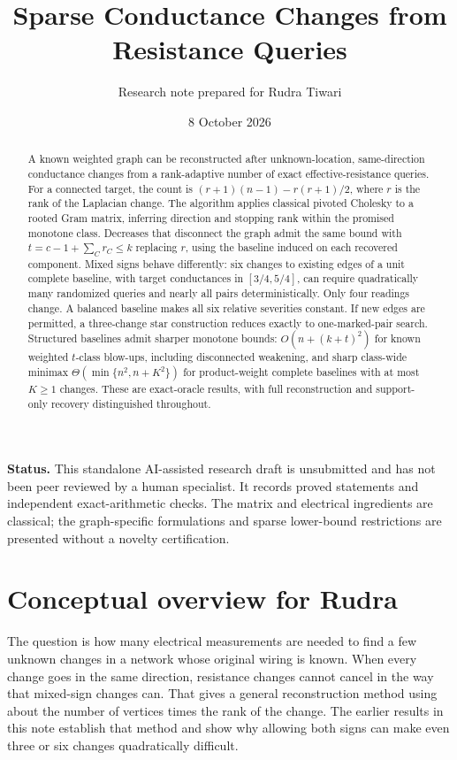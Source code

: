 \documentclass[11pt,letterpaper]{article}
\title{Sparse Conductance Changes from Resistance Queries}
\author{Research note prepared for Rudra Tiwari}
\date{8 October 2026}
\begin{document}
\maketitle
\begin{abstract}
A known weighted graph can be reconstructed after unknown-location, same-direction conductance changes from a rank-adaptive number of exact effective-resistance queries. For a connected target, the count is $(r+1)(n-1)-r(r+1)/2$, where $r$ is the rank of the Laplacian change. The algorithm applies classical pivoted Cholesky to a rooted Gram matrix, inferring direction and stopping rank within the promised monotone class. Decreases that disconnect the graph admit the same bound with $t=c-1+\sum_C r_C\le k$ replacing $r$, using the baseline induced on each recovered component. Mixed signs behave differently: six changes to existing edges of a unit complete baseline, with target conductances in $[3/4,5/4]$, can require quadratically many randomized queries and nearly all pairs deterministically. Only four readings change. A balanced baseline makes all six relative severities constant. If new edges are permitted, a three-change star construction reduces exactly to one-marked-pair search. Structured baselines admit sharper monotone bounds: $O(n+(k+t)^2)$ for known weighted $t$-class blow-ups, including disconnected weakening, and sharp class-wide minimax $\Theta(\min\{n^2,n+K^2\})$ for product-weight complete baselines with at most $K\ge1$ changes. These are exact-oracle results, with full reconstruction and support-only recovery distinguished throughout.
\end{abstract}

\noindent\textbf{Status.} This standalone AI-assisted research draft is unsubmitted and has not been peer reviewed by a human specialist. It records proved statements and independent exact-arithmetic checks. The matrix and electrical ingredients are classical; the graph-specific formulations and sparse lower-bound restrictions are presented without a novelty certification.


\section*{Conceptual overview for Rudra}
The question is how many electrical measurements are needed to find a few unknown changes in a network whose original wiring is known. When every change goes in the same direction, resistance changes cannot cancel in the way that mixed-sign changes can. That gives a general reconstruction method using about the number of vertices times the rank of the change. The earlier results in this note establish that method and show why allowing both signs can make even three or six changes quadratically difficult.
\end{document}
